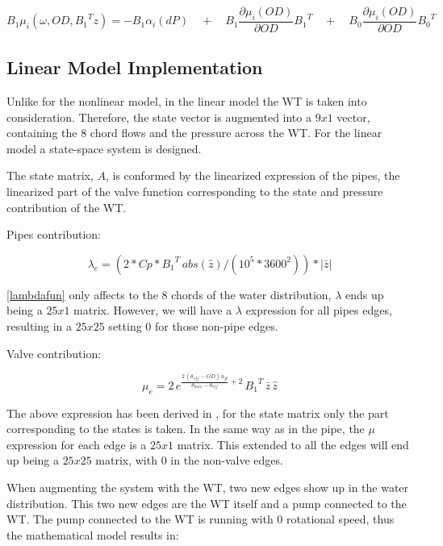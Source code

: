 \begin{equation}
  B_1 \mu_{i}(\omega, OD, {B_1}^{T}z) = - B_1 \alpha_{i}(dP) \quad + \quad B_1 \frac{\partial{\mu_{i}(OD)}}{\partial{OD}} {B_1}^{T}
  \quad + \quad B_0 \frac{\partial{\mu_{i}(OD)}}{\partial{OD}} {B_0}^{T}
\end{equation}



\subsection{Linear Model Implementation}
\label{MatlabScriptLinear}

Unlike for the nonlinear model, in the linear model the WT is taken into consideration. Therefore, the state vector is augmented into a $9x1$ vector, 
containing the 8 chord flows and the pressure across the WT. For the linear model a state-space system is designed.

The state matrix, $A$, is conformed by the linearized expression of the pipes, the linearized part of the valve function corresponding to the state and pressure contribution
of the WT.

Pipes contribution:

\begin{equation}
  {\lambda}_e = (2 * Cp * {B_1}^{T} \, abs(\hat{z}) /(10^5*3600^2))*|\bar{z}|
  \label{lambdafun}
\end{equation}

\eqref{lambdafun} only affects to the 8 chords of the water distribution, $\lambda$ ends up being a $25x1$ matrix. However, we will have a $\lambda$ expression for all pipes
edges, resulting in a $25x25$ setting $0$ for those non-pipe edges. 

Valve contribution:

\vspace{4mm}
\begin{equation}
  {\mu}_e =  2 \, e^{\frac{2 \, (\theta_{off} - \bar{OD}) \, n_{gl}}{\theta_{max}-\theta_{off}}+2} \, {B_1}^{T} \, \bar{z} \, \hat{z}
  \label{mufun}
\end{equation}

The above expression has been derived in , for the state matrix only the part corresponding to the states is taken. In the same way 
as in the pipe, the $\mu$ expression for each edge is a $25x1$ matrix. This extended to all the edges will end up being a $25x25$ matrix, with $0$ in the 
non-valve edges. 

When augmenting the system with the WT, two new edges show up in the water distribution. This two new edges are the WT itself and a pump connected to the WT.
The pump connected to the WT is running with $0$ rotational speed, thus the mathematical model results in:

